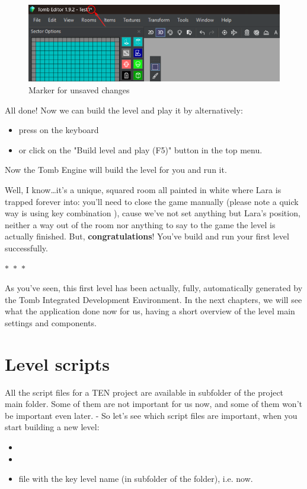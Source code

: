 \begin{figure}
    \centering
     \includegraphics[width=1\textwidth]{screenshots/1009.png}
     \caption{Marker for unsaved changes}
     \label{fig:TEUnsavedChanges} 
\end{figure}

All done! Now we can build the level and play it by alternatively:
\begin{itemize}
    \item press  on the keyboard
    \item or click on the "Build level and play (F5)" button in the top menu.
\end{itemize}
Now the Tomb Engine will build the level for you and run it.
\par Well, I know\dots it's a unique, squared room all painted in white where Lara is trapped forever into: you'll need to close the game manually (please note a quick way is using key combination ), cause we've not set anything but Lara's position, neither a way out of the room nor anything to say to the game the level is actually finished. But, \textbf{congratulations}! You've build and run your first level successfully.
\begin{center}
  $\ast$~$\ast$~$\ast$
\end{center}

\par As you've seen, this first level has been actually, fully, automatically generated by the Tomb Integrated Development Environment. In the next chapters, we will see what the application done now for us, having a short overview of the level main settings and components.



\chapter{Level scripts}
All the script files for a TEN project are available in  subfolder of the project main folder.
Some of them are not important for us now, and some of them won't be important even later. - So let's see which script files are important, when you start building a new level:
\begin{itemize}
    \item {}
    \item {}
    \item {} file with the key level name (in  subfolder of the  folder), i.e.  now.
\end{itemize}

